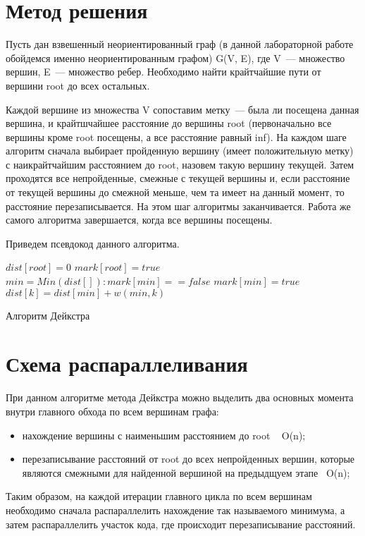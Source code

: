 \documentclass{report}
\newenvironment{pseudocode}[1][htb]
  {\renewcommand{\algorithmcfname}{Алгоритм}
   \begin{algorithm}[#1]%
  }{\end{algorithm}}
\begin{document}
\section*{Метод решения}
Пусть дан взвешенный неориентированный граф (в данной лабораторной работе обойдемся именно неориентированным графом) G(V, E), 
где V~--- множество вершин, E~--- множество ребер. Необходимо найти крайтчайшие пути от вершини root до всех остальных.
\par Каждой вершине из множества V сопоставим метку~--- была ли посещена данная вершина, и крайтшчайшее расстояние до вершины root 
(первоначально все вершины кроме root посещены, а все расстояние равный inf). На каждом шаге алгоритм сначала выбирает пройденную вершину (имеет положительную метку) с 
наикрайтчайшим расстоянием до root, назовем такую вершину текущей. Затем проходятся все непройденные, смежные с текущей вершины и, если расстояние от текущей вершины до смежной меньше, 
чем та имеет на данный момент, то расстояние перезаписывается. На этом шаг алгоритмы заканчивается. Работа же самого алгоритма завершается, когда все вершины посещены.
\par Приведем псевдокод данного алгоритма.
\begin{pseudocode}
\SetAlgoLined
{}
\BlankLine
\BlankLine
$dist[root] = 0$\;
$mark[root] = true$\;
\BlankLine
{} {
 $min = Min(dist[]): mark[min] == false$\;
 $mark[min] = true$\;
 \BlankLine
  {
 	 {
  	$dist[k] = dist[min] + w(min, k)$\;
  } } }
\caption{Алгоритм Дейкстра}
\end{pseudocode}
\newpage

\section*{Схема распараллеливания}
При данном алгоритме метода Дейкстра можно выделить два основных момента внутри главного обхода по всем вершинам графа:
\begin{itemize}
\item нахождение вершины с наименьшим расстоянием до root ~ O(n);
\item перезаписывание расстояний от root до всех непройденных вершин, которые являются смежными для найденной вершиной на предыдщуем этапе ~O(n);
\end{itemize}
\par Таким образом, на каждой итерации главного цикла по всем вершинам необходимо сначала распараллелить нахождение так называемого минимума, а затем
распараллелить участок кода, где происходит перезаписывание расстояний.
\newpage
\end{document}
